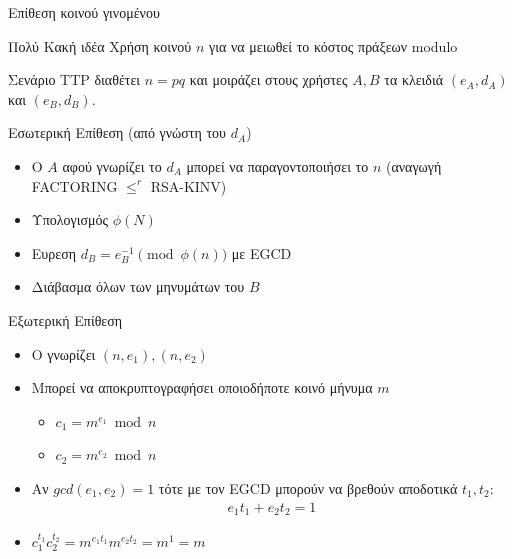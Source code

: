 \documentclass[handout]{beamer}
\begin{document}
\begin{frame}[allowframebreaks]{Επίθεση κοινού γινομένου}
\begin{block}{\alert{Πολύ Κακή ιδέα}}
Χρήση κοινού $n$ για να μειωθεί το κόστος πράξεων modulo
\end{block}
\medskip
\begin{block}{Σενάριο}
TTP διαθέτει $n=pq$ και μοιράζει στους χρήστες $A,B$ τα κλειδιά $(e_A,d_A)$ και $(e_B,d_B)$.
\end{block}
 
Εσωτερική Επίθεση (από γνώστη του $d_A$)
\begin{itemize}
\item Ο $A$ αφού γνωρίζει το $d_A$ μπορεί να παραγοντοποιήσει το $n$ (αναγωγή FACTORING $\leq^r$ RSA-KINV)
\item Υπολογισμός $\phi(N)$
\item Ευρεση  $d_B = e_B^{-1} \pmod{\phi(n)}$ με EGCD
\item Διάβασμα όλων των μηνυμάτων του $B$
\end{itemize}

\framebreak

Εξωτερική Επίθεση
\begin{itemize}
\item Ο \adv  γνωρίζει $(n,e_1),(n,e_2)$
\item Μπορεί να αποκρυπτογραφήσει οποιοδήποτε κοινό μήνυμα $m$
\begin{itemize}
\item $c_1 = m^{e_1} \bmod{n}$
\item $c_2 = m^{e_2} \bmod{n}$
\end{itemize}
\item Αν $gcd(e_1, e_2) = 1$ τότε με τον EGCD μπορούν να βρεθούν αποδοτικά $t_1, t_2$:
\begin{align*}
e_1 t_1 + e_2 t_2 = 1
\end{align*} 
\item $c_1^{t_1}c_2^{t_2} = m^{e_1t_1}m^{e_2t_2}=m^{1}=m$
\end{itemize}
 
\end{frame}
\end{document}
